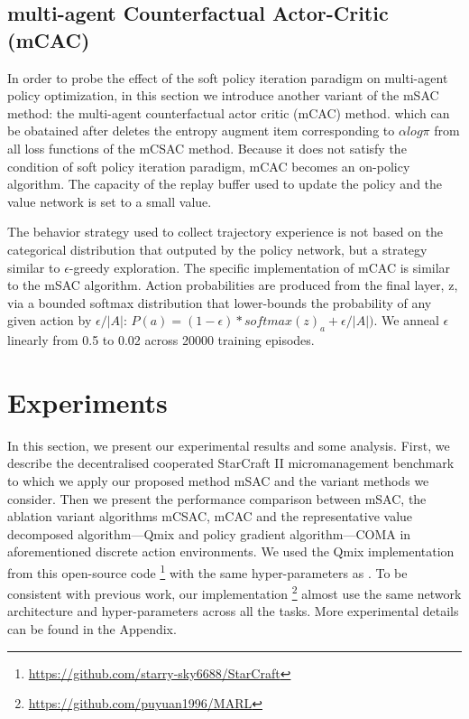 \documentclass[runningheads]{llncs}
\begin{document}
\subsection{multi-agent Counterfactual Actor-Critic (mCAC)}
In order to probe the effect of the soft policy iteration paradigm on multi-agent policy optimization, in this section we introduce another variant of the mSAC method: the multi-agent counterfactual actor critic (mCAC) method. 
which can be obatained after deletes the entropy augment item corresponding to $\alpha log \pi$ from all loss functions of the mCSAC method. Because it does not satisfy the condition of soft policy iteration paradigm, mCAC becomes an on-policy algorithm. The capacity of the replay buffer used to update the policy and the value network is set to a small value.

The behavior strategy used to collect trajectory experience is not based on the categorical distribution that outputed by the policy network, but a strategy similar to $\epsilon$-greedy exploration.
The specific implementation of mCAC is similar to the mSAC algorithm. 
Action probabilities are produced from the final layer, z, via a bounded softmax distribution that lower-bounds the probability of any given action by $\epsilon/|A|$:
$P(a) = (1-\epsilon)* softmax(z)_a + \epsilon/|A|)$. We anneal $\epsilon$ linearly
from 0.5 to 0.02 across 20000 training episodes.







\section{Experiments}
In this section, we present our experimental results and some analysis.  First, we describe the decentralised cooperated StarCraft II micromanagement benchmark to which we apply our proposed method mSAC and the variant methods we consider. Then we present the performance comparison between mSAC, the ablation variant algorithms mCSAC, mCAC and the representative value decomposed algorithm---Qmix and policy gradient algorithm---COMA   
in aforementioned discrete action environments. 
We used the Qmix implementation from this open-source code \footnote{\url{https://github.com/starry-sky6688/StarCraft}} with the same hyper-parameters as \cite{b7}. 
To be consistent with previous work, our implementation \footnote{\url{https://github.com/puyuan1996/MARL}} 
almost use the same network architecture and hyper-parameters across all the tasks.
 More experimental details can be found in the Appendix.
\end{document}
